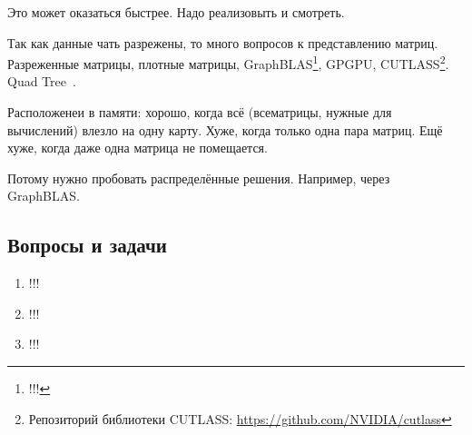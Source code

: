Это может оказаться быстрее. Надо реализовыть и смотреть.

Так как данные чать разрежены, то много вопросов к представлению матриц.
Разреженные матрицы, плотные матрицы, GraphBLAS\footnote{!!!}, GPGPU, CUTLASS\footnote{Репозиторий библиотеки CUTLASS: \url{https://github.com/NVIDIA/cutlass}}.
Quad Tree~\cite{!!!}.

Расположенеи в памяти: хорошо, когда всё (всематрицы, нужные для вычислений) влезло на одну карту.
Хуже, когда только одна пара матриц.
Ещё хуже, когда даже одна матрица не помещается.

Потому нужно пробовать распределённые решения.
Например, через GraphBLAS.


\subsection{Вопросы и задачи}
\begin{enumerate}
  \item !!!
  \item !!!
  \item !!!
\end{enumerate}
